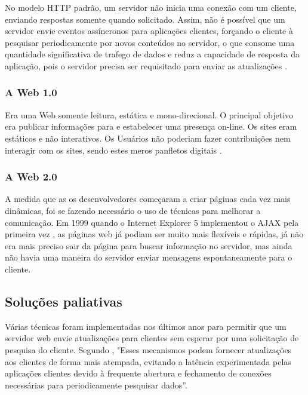 No modelo HTTP padrão, um servidor não inicia uma conexão com um cliente, enviando respostas somente quando solicitado. Assim, não é possível que um servidor envie eventos assíncronos para aplicações clientes, forçando o cliente à pesquisar periodicamente por novos conteúdos no servidor, o que consome uma quantidade significativa de trafego de dados e reduz a capacidade de resposta da aplicação, pois o servidor precisa ser requisitado para enviar as atualizações \cite{Loreto2011}.

\subsubsection{A Web 1.0}
Era uma Web somente leitura, estática e mono-direcional. O principal objetivo era publicar informações para e estabelecer uma presença on-line. Os sites eram estáticos e não interativos. Os Usuários não poderiam fazer contribuições nem interagir com os sites, sendo estes meros panfletos digitais \cite[p.~2-3]{Aghaei2012}.

\subsubsection{A Web 2.0}
A medida que as os desenvolvedores começaram a criar páginas cada vez mais dinâmicas, foi se fazendo necessário o uso de técnicas para melhorar a comunicação. Em 1999 quando o Internet Explorer 5 implementou o AJAX pela primeira vez \cite{Asleson2006}, as páginas web já podiam ser muito mais flexíveis e rápidas, já não era mais preciso sair da página para buscar informação no servidor, mas ainda não havia uma maneira do servidor enviar mensagens espontaneamente para o cliente.


\subsection{Soluções paliativas}

Várias técnicas foram implementadas nos últimos anos para permitir que um servidor web envie atualizações para clientes sem esperar por uma solicitação de pesquisa do cliente. Segundo , "Esses mecanismos podem fornecer atualizações aos clientes de forma mais atempada, evitando a latência experimentada pelas aplicações clientes devido à frequente abertura e fechamento de conexões necessárias para periodicamente pesquisar dados”.

